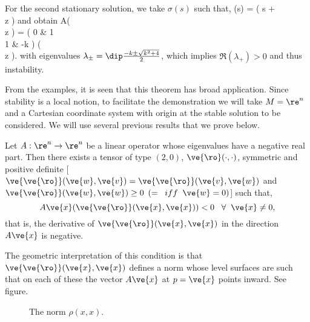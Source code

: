 For the second stationary solution, we take $\sigma(s)$ such that,
\beq 
 \phi \circ \sigma(s) = \left(  \delta \theta s + \pi \\ \delta z 
\earr \right)
\eeq 
and obtain
\beq
 A\left(  \delta \theta \\ 
                 \delta z 
           \earr \right) = \left(  0 & 1 \\ 
                                          1 & -k 
                           \earr \right)  
                           \left(  \delta \theta \\ \delta z 
                           \earr \right). 
\eeq
with eigenvalues $\lambda_{\pm} = \dip\frac{-k \pm \sqrt{k^2 + 4}}{2}$, which implies $\Re (\lambda_{+}) > 0$ and thus instability.

From the examples, it is seen that this theorem has broad application. Since stability is a local notion, to facilitate the demonstration we will take $M = \re^n$ and a Cartesian coordinate system with origin at the stable solution to be considered. We will use several previous results that we prove below.

\bteo[Lyapunov] 
Let $A:\re^n \rightarrow \re^n$ be a linear operator whose eigenvalues have a negative real part. Then there exists a tensor of type $(2,0)$, $\ve{\ro}(\cdot,\cdot)$, symmetric and positive definite [$\ve{\ve{\ro}}(\ve{w},\ve{v}) = \ve{\ve{\ro}} (\ve{v},\ve{w})$ and $\ve{\ve{\ro}}(\ve{w},\ve{w}) \geq 0$ $(=\;\; iff\;\; \ve{w}=0)$] such that,
$$
A\ve{x}(\ve{\ve{\ro}}(\ve{x},\ve{x})) < 0 \;\;\;\forall \;\;\ve{x} \neq 0,
$$
that is, the derivative of $\ve{\ve{\ro}}(\ve{x},\ve{x}) $ in the direction $A\ve{x}$ is negative.
\eteo

The geometric interpretation of this condition is that $\ve{\ve{\ro}}(\ve{x},\ve{x})$ defines a norm whose level surfaces are such that on each of these the vector $A\ve{x}$ at $p=\ve{x}$ points inward. See figure.

\espa 
\begin{figure}[htbp]
  \begin{center}
    \caption{The norm $\rho(x,x)$.}
    \label{fig:6_3}
  \end{center}
\end{figure}

